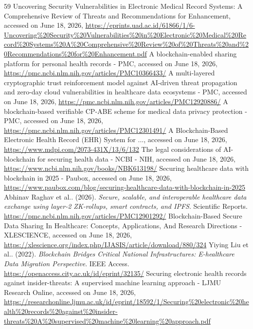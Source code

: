 \documentclass[12pt]{article}
\begin{document}
\begin{sloppypar}
\begin{thebibliography}{59}
 Uncovering Security Vulnerabilities in Electronic Medical Record Systems: A Comprehensive Review of Threats and Recommendations for Enhancement, accessed on June 18, 2026, \url{https://eprints.uad.ac.id/61866/1/6-Uncovering%20Security%20Vulnerabilities%20in%20Electronic%20Medical%20Record%20Systems%20A%20Comprehensive%20Review%20of%20Threats%20and%20Recommendations%20for%20Enhancement.pdf}
 A blockchain-enabled sharing platform for personal health records - PMC, accessed on June 18, 2026, \url{https://pmc.ncbi.nlm.nih.gov/articles/PMC10366433/}
 A multi-layered cryptographic trust reinforcement model against AI-driven threat propagation and zero-day cloud vulnerabilities in healthcare data ecosystems - PMC, accessed on June 18, 2026, \url{https://pmc.ncbi.nlm.nih.gov/articles/PMC12920886/}
 A blockchain-based verifiable CP-ABE scheme for medical data privacy protection - PMC, accessed on June 18, 2026, \url{https://pmc.ncbi.nlm.nih.gov/articles/PMC12301491/}
 A Blockchain-Based Electronic Health Record (EHR) System for ..., accessed on June 18, 2026, \url{https://www.mdpi.com/2073-431X/13/6/132}
 The legal considerations of AI-blockchain for securing health data - NCBI - NIH, accessed on June 18, 2026, \url{https://www.ncbi.nlm.nih.gov/books/NBK613198/}
 Securing healthcare data with blockchain in 2025 - Paubox, accessed on June 18, 2026, \url{https://www.paubox.com/blog/securing-healthcare-data-with-blockchain-in-2025}
 Abhinav Raghav et al.. (2026). \textit{Secure, scalable, and interoperable healthcare data exchange using layer-2 ZK-rollups, smart contracts, and IPFS}. Scientific Reports. \url{https://pmc.ncbi.nlm.nih.gov/articles/PMC12901292/}
 Blockchain-Based Secure Data Sharing In Healthcare: Concepts, Applications, And Research Directions - XLESCIENCE, accessed on June 18, 2026, \url{https://xlescience.org/index.php/IJASIS/article/download/880/324}
 Yiying Liu et al.. (2022). \textit{Blockchain Bridges Critical National Infrastructures: E-healthcare Data Migration Perspective}. IEEE Access. \url{https://openaccess.city.ac.uk/id/eprint/32135/}
 Securing electronic health records against insider-threats: A supervised machine learning approach - LJMU Research Online, accessed on June 18, 2026, \url{https://researchonline.ljmu.ac.uk/id/eprint/18592/1/Securing%20electronic%20health%20records%20against%20insider-threats%20A%20supervised%20machine%20learning%20approach.pdf}

\end{thebibliography}
\end{sloppypar}
\end{document}
